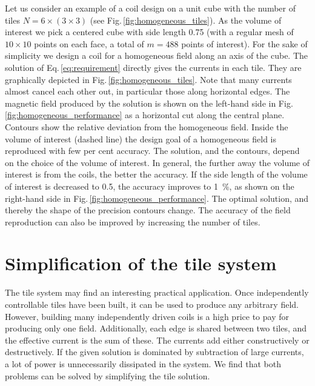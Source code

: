 Let us consider an example of a coil design on a unit cube with the number of tiles $N = 6 \times (3 \times 3)$ (see Fig.\,\ref{fig:homogeneous_tiles}).
As the volume of interest we pick a centered cube with side length \num{0.75} (with a regular mesh of $10 \times 10$ points on each face, a total of $m = 488$ points of interest).
For the sake of simplicity we design a coil for a homogeneous field along an axis of the cube.
The solution of Eq.\,\ref{eq:requirement} directly gives the currents in each tile.
They are graphically depicted in Fig.\,\ref{fig:homogeneous_tiles}.
Note that many currents almost cancel each other out, in particular those along horizontal edges.
The magnetic field produced by the solution is shown on the left-hand side in Fig.\,\ref{fig:homogeneous_performance} as a horizontal cut along the central plane.
Contours show the relative deviation from the homogeneous field.
Inside the volume of interest (dashed line) the design goal of a homogeneous field is reproduced with few per cent accuracy.
The solution, and the contours, depend on the choice of the volume of interest.
In general, the further away the volume of interest is from the coils, the better the accuracy.
If the side length of the volume of interest is decreased to \num{0.5}, the accuracy improves to \SI{1}{\percent}, as shown on the right-hand side in Fig.\,\ref{fig:homogeneous_performance}.
The optimal solution, and thereby the shape of the precision contours change.
The accuracy of the field reproduction can also be improved by increasing the number of tiles.




\section{Simplification of the tile system}
The tile system may find an interesting practical application.
Once independently controllable tiles have been built, it can be used to produce any arbitrary field.
However, building many independently driven coils is a high price to pay for producing only one field.
Additionally, each edge is shared between two tiles, and the effective current is the sum of these.
The currents add either constructively or destructively.
If the given solution is dominated by subtraction of large currents, a lot of power is unnecessarily dissipated in the system.
We find that both problems can be solved by simplifying the tile solution.

